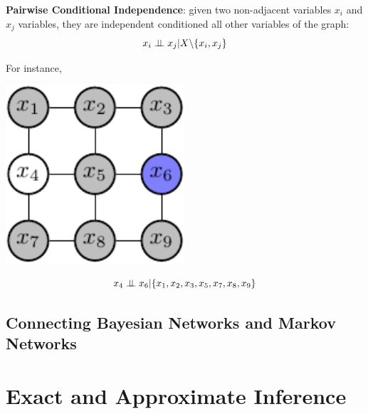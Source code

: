 \begin{corollary}
\textbf{Pairwise Conditional Independence}:
  given two non-adjacent variables $x_i$ and $x_j$ variables, they are independent conditioned all other variables of the graph:
 \begin{equation*}
  x_i \perp\!\!\!\perp x_j | X \backslash \{x_i,x_j\}
 \end{equation*}
\end{corollary}
For instance,  \newline\newline 
\begin{minipage}[c]{0.5\textwidth}   
	\centering
	\includegraphics[width=0.5\textwidth]{./Figures/markov_net_2.pdf}
\end{minipage}
\begin{minipage}[c]{0.4\textwidth}
   \begin{equation*}
    x_4 \perp\!\!\!\perp x_6 |\{x_1,x_2,x_3,x_5,x_7,x_8,x_9\}
   \end{equation*}
\end{minipage}


\subsection{Connecting Bayesian Networks and Markov Networks}






\section{Exact and Approximate Inference}
\label{sec:inference}
